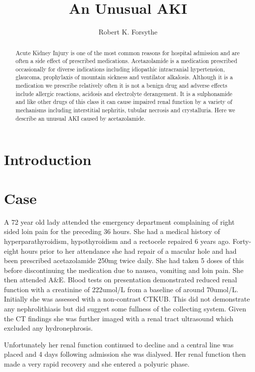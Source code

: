 \documentclass[11pt, ]{article}
\title{An Unusual AKI}
\author{Robert K. Forsythe}
\begin{document}
\maketitle
\begin{abstract}
	Acute Kidney Injury is one of the most common reasons for hospital admission and are often a side effect of prescribed medications. Acetazolamide is a medication prescribed occasionally for diverse indications including idiopathic intracranial hypertension, glaucoma, prophylaxis of mountain sickness and ventilator alkalosis. Although it is a medication we prescribe relatively often it is not a benign drug and adverse effects include allergic reactions, acidosis and electrolyte derangement. It is a sulphonamide and like other drugs of this class it can cause impaired renal function by a variety of mechanisms including interstitial nephritis, tubular necrosis and crystalluria. Here we describe an unusual AKI caused by acetazolamide.
\end{abstract}

\section*{Introduction}

		
\section*{Case}

A 72 year old lady attended the emergency department complaining of right sided loin pain for the preceding 36 hours. She had a medical history of hyperparathyroidism, hypothyroidism and a rectocele repaired 6 years ago. Forty-eight hours prior to her attendance she had repair of a macular hole and had been prescribed acetazolamide 250mg twice daily. She had taken 5 doses of this before discontinuing the medication due to nausea, vomiting and loin pain. She then attended A\&E. Blood tests on presentation demonstrated reduced renal function with a creatinine of 222umol/L from a baseline of around 70umol/L. Initially she was assessed with a non-contrast CTKUB. This did not demonstrate any nephrolithiasis but did suggest some fullness of the collecting system. Given the CT findings she was further imaged with a renal tract ultrasound which excluded any hydronephrosis. 

Unfortunately her renal function continued to decline and a central line was placed and 4 days following admission she was dialysed. Her renal function then made a very rapid recovery and she entered a polyuric phase. 
\end{document}
